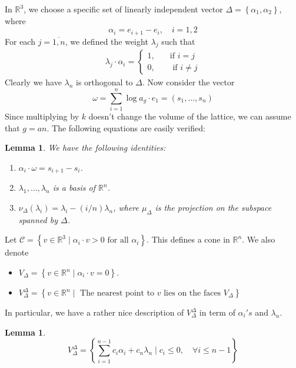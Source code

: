 \documentclass[12pt]{article} %
\newtheorem{lemma}[theorem]{Lemma}
\begin{document}
    In $\mathbb{R}^3$, we choose a specific set of linearly independent vector $\Delta = \left\lbrace \alpha_1,\alpha_2\right\rbrace$, where
    \[\alpha_i = e_{i+1}-e_i, \quad i = 1,2\]
    For each $j = \overline{1,n}$, we defined the weight $\lambda_j$ such that 
    \begin{align*}
        \lambda_j \cdot \alpha_i = \begin{cases}
            1, \quad &\text{if } i =j \\
            0, \quad &\text{ if } i \ne j
        \end{cases}
    \end{align*}
    Clearly we have $\lambda_n$ is orthogonal to $\Delta$. Now consider the vector 
    \[\omega = \sum_{i=1}^n \log{a_g} \cdot e_1 = (s_1,\ldots, s_n)\]
    Since multiplying by $k$ doesn't change the volume of the lattice, we can assume that $g = an$.
    The following equations are easily verified:
    \begin{lemma}
        We have the following identities:
        \begin{enumerate}
            \item $\alpha_i \cdot \omega = s_{i+1}-s_i$.
            \item $\lambda_1,\ldots,\lambda_n$ is a basis of $\mathbb{R}^n$.
            \item $\nu_\Delta(\lambda_i) = \lambda_i - (i/n)\lambda_n$, where $\mu_\Delta$ is the projection on the subspace spanned by $\Delta$.
        \end{enumerate}
    \end{lemma}
    Let $\mathcal{C} = \left\lbrace v \in \mathbb{R}^3\mid \alpha_i \cdot v > 0 \text{ for all } \alpha_i\right\rbrace$. This defines a cone in $\mathbb{R}^n$. We also denote
    \begin{itemize}
        \item $V_{\Delta} = \left\lbrace v \in \mathbb{R}^n\mid \alpha_i \cdot v = 0\right\rbrace$.
        \item $V_{\Delta}^\Delta = \left\lbrace v\in \mathbb{R}^n \mid \text{ The nearest point to $v$ lies on the faces $V_\Delta$}\right\rbrace $
    \end{itemize}
    In particular, we have a rather nice description of $V_{\Delta}^\Delta$ in term of $\alpha_i's$ and $\lambda_n$.
    \begin{lemma}
        \[V_{\Delta}^\Delta = \left\lbrace \sum_{i=1}^{n-1}c_i\alpha_i + c_n\lambda_n\mid c_i \le 0, \quad\forall i \le n-1\right\rbrace \]
    \end{lemma}
\end{document}
